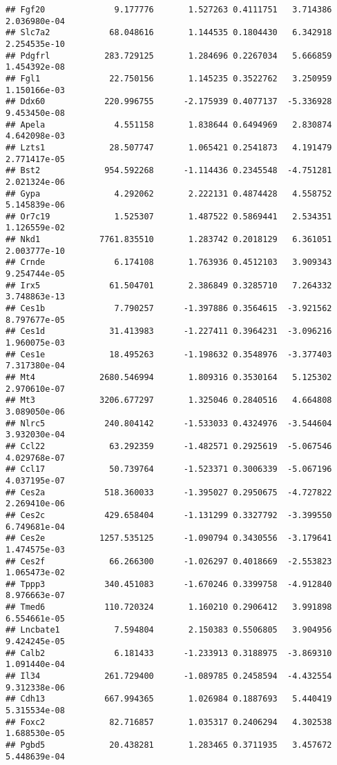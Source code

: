 \documentclass[
]{article}
\begin{document}
\begin{verbatim}
## Fgf20              9.177776       1.527263 0.4111751   3.714386 2.036980e-04
## Slc7a2            68.048616       1.144535 0.1804430   6.342918 2.254535e-10
## Pdgfrl           283.729125       1.284696 0.2267034   5.666859 1.454392e-08
## Fgl1              22.750156       1.145235 0.3522762   3.250959 1.150166e-03
## Ddx60            220.996755      -2.175939 0.4077137  -5.336928 9.453450e-08
## Apela              4.551158       1.838644 0.6494969   2.830874 4.642098e-03
## Lzts1             28.507747       1.065421 0.2541873   4.191479 2.771417e-05
## Bst2             954.592268      -1.114436 0.2345548  -4.751281 2.021324e-06
## Gypa               4.292062       2.222131 0.4874428   4.558752 5.145839e-06
## Or7c19             1.525307       1.487522 0.5869441   2.534351 1.126559e-02
## Nkd1            7761.835510       1.283742 0.2018129   6.361051 2.003777e-10
## Crnde              6.174108       1.763936 0.4512103   3.909343 9.254744e-05
## Irx5              61.504701       2.386849 0.3285710   7.264332 3.748863e-13
## Ces1b              7.790257      -1.397886 0.3564615  -3.921562 8.797677e-05
## Ces1d             31.413983      -1.227411 0.3964231  -3.096216 1.960075e-03
## Ces1e             18.495263      -1.198632 0.3548976  -3.377403 7.317380e-04
## Mt4             2680.546994       1.809316 0.3530164   5.125302 2.970610e-07
## Mt3             3206.677297       1.325046 0.2840516   4.664808 3.089050e-06
## Nlrc5            240.804142      -1.533033 0.4324976  -3.544604 3.932030e-04
## Ccl22             63.292359      -1.482571 0.2925619  -5.067546 4.029768e-07
## Ccl17             50.739764      -1.523371 0.3006339  -5.067196 4.037195e-07
## Ces2a            518.360033      -1.395027 0.2950675  -4.727822 2.269410e-06
## Ces2c            429.658404      -1.131299 0.3327792  -3.399550 6.749681e-04
## Ces2e           1257.535125      -1.090794 0.3430556  -3.179641 1.474575e-03
## Ces2f             66.266300      -1.026297 0.4018669  -2.553823 1.065473e-02
## Tppp3            340.451083      -1.670246 0.3399758  -4.912840 8.976663e-07
## Tmed6            110.720324       1.160210 0.2906412   3.991898 6.554661e-05
## Lncbate1           7.594804       2.150383 0.5506805   3.904956 9.424245e-05
## Calb2              6.181433      -1.233913 0.3188975  -3.869310 1.091440e-04
## Il34             261.729400      -1.089785 0.2458594  -4.432554 9.312338e-06
## Cdh13            667.994365       1.026984 0.1887693   5.440419 5.315534e-08
## Foxc2             82.716857       1.035317 0.2406294   4.302538 1.688530e-05
## Pgbd5             20.438281       1.283465 0.3711935   3.457672 5.448639e-04

\end{verbatim}
\end{document}
